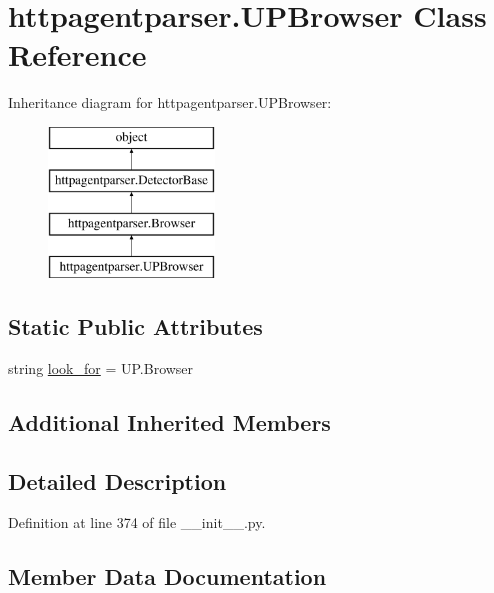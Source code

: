\hypertarget{classhttpagentparser_1_1_u_p_browser}{}\section{httpagentparser.\+U\+P\+Browser Class Reference}
\label{classhttpagentparser_1_1_u_p_browser}
Inheritance diagram for httpagentparser.\+U\+P\+Browser\+:\begin{figure}[H]
\begin{center}
\leavevmode
\includegraphics[height=4.000000cm]{classhttpagentparser_1_1_u_p_browser}
\end{center}
\end{figure}
\subsection*{Static Public Attributes}
\begin{DoxyCompactItemize}
\item 
string \hyperlink{classhttpagentparser_1_1_u_p_browser_a0497b7cbc4ab55f955a8122e7bfc3a6e}{look\+\_\+for} = \textquotesingle{}U\+P.\+Browser\textquotesingle{}
\end{DoxyCompactItemize}
\subsection*{Additional Inherited Members}


\subsection{Detailed Description}


Definition at line 374 of file \+\_\+\+\_\+init\+\_\+\+\_\+.\+py.



\subsection{Member Data Documentation}
\hypertarget{classhttpagentparser_1_1_u_p_browser_a0497b7cbc4ab55f955a8122e7bfc3a6e}{}\label{classhttpagentparser_1_1_u_p_browser_a0497b7cbc4ab55f955a8122e7bfc3a6e} 
